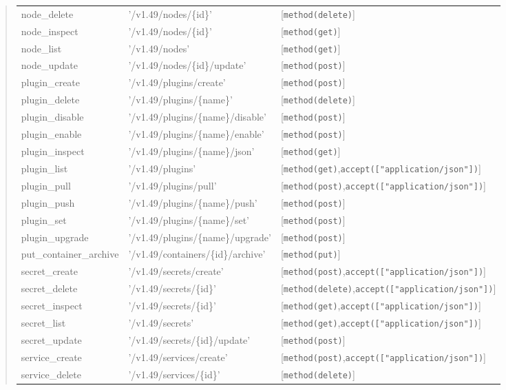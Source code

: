 \begin{description}
\begin{quote}
\begin{tabulary}{0.9\textwidth}{|l|L|L|}
node_delete & '/v1.49/nodes/\{id\}' & [\verb$method(delete)$] \\
node_inspect & '/v1.49/nodes/\{id\}' & [\verb$method(get)$] \\
node_list & '/v1.49/nodes' & [\verb$method(get)$] \\
node_update & '/v1.49/nodes/\{id\}/update' & [\verb$method(post)$] \\
plugin_create & '/v1.49/plugins/create' & [\verb$method(post)$] \\
plugin_delete & '/v1.49/plugins/\{name\}' & [\verb$method(delete)$] \\
plugin_disable & '/v1.49/plugins/\{name\}/disable' & [\verb$method(post)$] \\
plugin_enable & '/v1.49/plugins/\{name\}/enable' & [\verb$method(post)$] \\
plugin_inspect & '/v1.49/plugins/\{name\}/json' & [\verb$method(get)$] \\
plugin_list & '/v1.49/plugins' & [\verb$method(get)$,\verb$accept(["application/json"])$] \\
plugin_pull & '/v1.49/plugins/pull' & [\verb$method(post)$,\verb$accept(["application/json"])$] \\
plugin_push & '/v1.49/plugins/\{name\}/push' & [\verb$method(post)$] \\
plugin_set & '/v1.49/plugins/\{name\}/set' & [\verb$method(post)$] \\
plugin_upgrade & '/v1.49/plugins/\{name\}/upgrade' & [\verb$method(post)$] \\
put_container_archive & '/v1.49/containers/\{id\}/archive' & [\verb$method(put)$] \\
secret_create & '/v1.49/secrets/create' & [\verb$method(post)$,\verb$accept(["application/json"])$] \\
secret_delete & '/v1.49/secrets/\{id\}' & [\verb$method(delete)$,\verb$accept(["application/json"])$] \\
secret_inspect & '/v1.49/secrets/\{id\}' & [\verb$method(get)$,\verb$accept(["application/json"])$] \\
secret_list & '/v1.49/secrets' & [\verb$method(get)$,\verb$accept(["application/json"])$] \\
secret_update & '/v1.49/secrets/\{id\}/update' & [\verb$method(post)$] \\
service_create & '/v1.49/services/create' & [\verb$method(post)$,\verb$accept(["application/json"])$] \\
service_delete & '/v1.49/services/\{id\}' & [\verb$method(delete)$] \\

\end{tabulary}
\end{quote}
\end{description}
